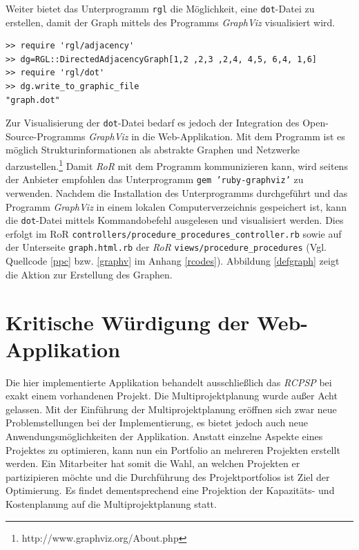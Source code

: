 \documentclass[a4paper,12pt,parskip,bibtotoc,liststotoc]{article}
\begin{document}
Weiter bietet das Unterprogramm \texttt{rgl} die Möglichkeit, eine \texttt{dot}-Datei zu erstellen, damit der Graph mittels des Programms \textit{GraphViz} visualisiert wird.
\begin{lstlisting}[caption=Prüfung auf Zyklen mittels des Unterprogramms \glqq rgl\grqq, style=Listing, label=rgl-vonseite]
>> require 'rgl/adjacency'
>> dg=RGL::DirectedAdjacencyGraph[1,2 ,2,3 ,2,4, 4,5, 6,4, 1,6]
>> require 'rgl/dot'
>> dg.write_to_graphic_file
"graph.dot"
\end{lstlisting}

Zur Visualisierung der \texttt{dot}-Datei bedarf es jedoch der Integration des Open-Source-Programms \textit{GraphViz} in die Web-Applikation. Mit dem Programm ist es möglich Strukturinformationen als abstrakte Graphen und Netzwerke darzustellen.\footnote{http://www.graphviz.org/About.php} Damit \textit{RoR} mit dem Programm kommunizieren kann, wird seitens der Anbieter empfohlen das Unterprogramm \texttt{gem 'ruby-graphviz'} zu verwenden. Nachdem die Installation des Unterprogramms durchgeführt und das Programm \textit{GraphViz} in einem lokalen Computerverzeichnis gespeichert ist, kann die \texttt{dot}-Datei mittels Kommandobefehl ausgelesen und visualisiert werden. Dies erfolgt im RoR \texttt{controllers/procedure\_procedures\_controller.rb} sowie auf der Unterseite \texttt{graph.html.rb} der \textit{RoR} \texttt{views/procedure\_procedures} (Vgl. Quellcode \ref{ppc} bzw. \ref{graphv} im Anhang \ref{rcodes}). Abbildung \ref{defgraph} zeigt die Aktion zur Erstellung des Graphen.



\section{Kritische Würdigung der Web-Applikation} \label{krit}
Die hier implementierte Applikation behandelt ausschließlich das \textit{RCPSP} bei exakt einem vorhandenen Projekt. Die Multiprojektplanung wurde außer Acht gelassen. Mit der Einführung der Multiprojektplanung eröffnen sich zwar neue Problemstellungen bei der Implementierung, es bietet jedoch auch neue Anwendungsmöglichkeiten der Applikation. Anstatt einzelne Aspekte eines Projektes zu optimieren, kann nun ein Portfolio an mehreren Projekten erstellt werden. Ein Mitarbeiter hat somit die Wahl, an welchen Projekten er partizipieren möchte und die Durchführung des Projektportfolios ist Ziel der Optimierung. Es findet dementsprechend eine Projektion der Kapazitäts- und Kostenplanung auf die Multiprojektplanung statt.\\
\end{document}
